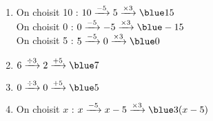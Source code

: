    \ \\ [-5mm]
   \begin{enumerate}
      \item On choisit 10 : $10\xrightarrow{-5}5\xrightarrow{\times3}\blue15$ \\ \smallskip
      On choisit 0 : $0\xrightarrow{-5}-5\xrightarrow{\times3}\blue-15$ \\ \smallskip
      On choisit 5 : $5\xrightarrow{-5}0\xrightarrow{\times3}\blue0$ \smallskip

      \item $6\xrightarrow{\div3}2\xrightarrow{+5}\blue7$ \smallskip
      \item $0\xrightarrow{\div3}0\xrightarrow{+5}\blue5$ \smallskip
      \item On choisit $x$ : $x\xrightarrow{-5}x-5\xrightarrow{\times3}\blue3(x-5)$
   \end{enumerate}
